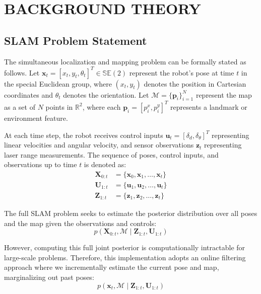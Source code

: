 \documentclass[11pt]{article}
\begin{document}
\section{ BACKGROUND THEORY}

\subsection{SLAM Problem Statement}

The simultaneous localization and mapping problem can be formally stated as follows. Let $\mathbf{x}_t = [x_t, y_t, \theta_t]^T \in \mathbb{SE}(2)$ represent the robot's pose at time $t$ in the special Euclidean group, where $(x_t, y_t)$ denotes the position in Cartesian coordinates and $\theta_t$ denotes the orientation. Let $\mathcal{M} = \{\mathbf{p}_i\}_{i=1}^{N}$ represent the map as a set of $N$ points in $\mathbb{R}^2$, where each $\mathbf{p}_i = [p_i^x, p_i^y]^T$ represents a landmark or environment feature.

At each time step, the robot receives control inputs $\mathbf{u}_t = [\delta_d, \delta_\theta]^T$ representing linear velocities and angular velocity, and sensor observations $\mathbf{z}_t$ representing laser range measurements. The sequence of poses, control inputs, and observations up to time $t$ is denoted as:
\begin{align}
	\mathbf{X}_{0:t} &= \{\mathbf{x}_0, \mathbf{x}_1, \ldots, \mathbf{x}_t\} \\
	\mathbf{U}_{1:t} &= \{\mathbf{u}_1, \mathbf{u}_2, \ldots, \mathbf{u}_t\} \\
	\mathbf{Z}_{1:t} &= \{\mathbf{z}_1, \mathbf{z}_2, \ldots, \mathbf{z}_t\}
\end{align}

The full SLAM problem seeks to estimate the posterior distribution over all poses and the map given the observations and controls:
\begin{equation}
	p(\mathbf{X}_{0:t}, \mathcal{M} \mid \mathbf{Z}_{1:t}, \mathbf{U}_{1:t})
\end{equation}

However, computing this full joint posterior is computationally intractable for large-scale problems. Therefore, this implementation adopts an online filtering approach where we incrementally estimate the current pose and map, marginalizing out past poses:
\begin{equation}
	p(\mathbf{x}_t, \mathcal{M} \mid \mathbf{Z}_{1:t}, \mathbf{U}_{1:t})
\end{equation}
\end{document}
